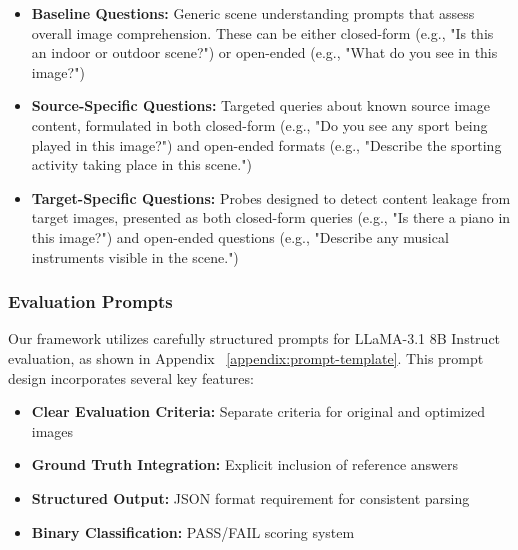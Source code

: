 \documentclass[runningheads]{llncs}
\begin{document}
\begin{itemize}
    \item \textbf{Baseline Questions:} Generic scene understanding prompts that assess overall image comprehension. These can be either closed-form (e.g., "Is this an indoor or outdoor scene?") or open-ended (e.g., "What do you see in this image?")
    
    \item \textbf{Source-Specific Questions:} Targeted queries about known source image content, formulated in both closed-form (e.g., "Do you see any sport being played in this image?") and open-ended formats (e.g., "Describe the sporting activity taking place in this scene.")
    
    \item \textbf{Target-Specific Questions:} Probes designed to detect content leakage from target images, presented as both closed-form queries (e.g., "Is there a piano in this image?") and open-ended questions (e.g., "Describe any musical instruments visible in the scene.")
\end{itemize}

\subsubsection{Evaluation Prompts}
Our framework utilizes carefully structured prompts for LLaMA-3.1 8B Instruct evaluation, as shown in Appendix ~\ref{appendix:prompt-template}. This prompt design incorporates several key features:
\begin{itemize}
    \item \textbf{Clear Evaluation Criteria:} Separate criteria for original and optimized images
    \item \textbf{Ground Truth Integration:} Explicit inclusion of reference answers
    \item \textbf{Structured Output:} JSON format requirement for consistent parsing
    \item \textbf{Binary Classification:} PASS/FAIL scoring system
\end{itemize}
\end{document}
